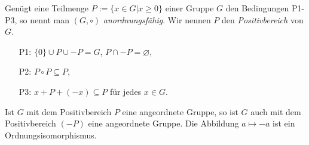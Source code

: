 %
\begin{bem}\label{afG} %
%
Genügt eine Teilmenge $P := \lbrace x \in G | x \geq 0\rbrace$ einer Gruppe $G$ den Bedingungen P1- P3, so nennt man $\left(G,\circ\right)$ \textit{anordnungsfähig}. Wir nennen $P$ den \textit{Positivbereich} von $G$.
%
\begin{enumerate}
\item[P1:] $\lbrace0\rbrace \cup P\cup -P = G$, $P \cap -P = \varnothing$,
\item[P2:] $P \circ P \subseteq P$,
\item[P3:] $x+P+(-x) \subseteq P$ für jedes $x \in G$.
\end{enumerate}

\end{bem}
%
%
%
\begin{bsp}
Ist $G$ mit dem Positivbereich $P$ eine angeordnete Gruppe, so ist $G$ auch mit dem Positivbereich $(-P)$ eine angeordnete Gruppe. Die Abbildung $a \mapsto -a$ ist ein Ordnungsisomorphismus.
\end{bsp}
%

